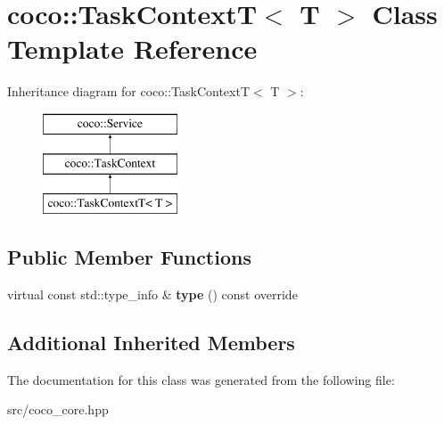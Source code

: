 \hypertarget{classcoco_1_1_task_context_t}{}\section{coco\+:\+:Task\+Context\+T$<$ T $>$ Class Template Reference}
\label{classcoco_1_1_task_context_t}
Inheritance diagram for coco\+:\+:Task\+Context\+T$<$ T $>$\+:\begin{figure}[H]
\begin{center}
\leavevmode
\includegraphics[height=3.000000cm]{classcoco_1_1_task_context_t}
\end{center}
\end{figure}
\subsection*{Public Member Functions}
\begin{DoxyCompactItemize}
\item 
\hypertarget{classcoco_1_1_task_context_t_a0cd1cf23e0679a4dc147ac8716dafea0}{}virtual const std\+::type\+\_\+info \& {\bfseries type} () const override\label{classcoco_1_1_task_context_t_a0cd1cf23e0679a4dc147ac8716dafea0}

\end{DoxyCompactItemize}
\subsection*{Additional Inherited Members}


The documentation for this class was generated from the following file\+:\begin{DoxyCompactItemize}
\item 
src/coco\+\_\+core.\+hpp\end{DoxyCompactItemize}
